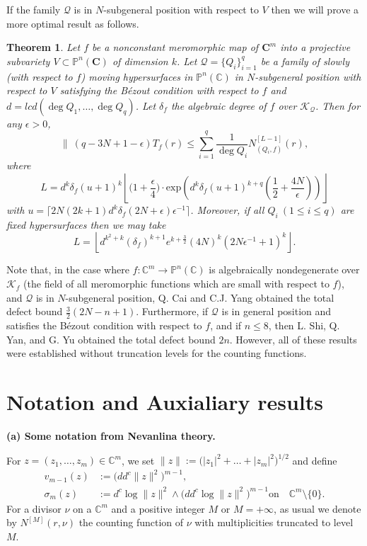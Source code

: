 \documentclass[12pt,leqno]{amsart}
\newtheorem{theorem}[equation]{Theorem}
\newcommand{\C}{{\mathbb{C}}}
\renewcommand{\P}{{\mathbb{P}}}
\numberwithin{equation}{section}
\begin{document}
If the family $\mathcal Q$ is in $N$-subgeneral position with respect to $V$ then we will prove a more optimal result as follows.
\begin{theorem}\label{1.2}
Let $f$ be a nonconstant meromorphic map of $\mathbf{C}^m$ into a projective subvariety $V\subset\P^n(\mathbf{C})$ of dimension $k$. Let $\mathcal Q=\{Q_i\}_{i=1}^q$ be a family of slowly (with respect to $f$) moving hypersurfaces in $\P^n(\C)$ in $N$-subgeneral position with respect to $V$ satisfying the B\'{e}zout condition with respect to $f$ and $d=lcd(\deg Q_1,\ldots,\deg Q_q)$. Let $\delta_f$ the algebraic degree of $f$ over $\mathcal K_{\mathcal Q}$. Then for any $\epsilon >0$, 
$$  \|\ (q-3N+1-\epsilon)T_f(r)\le \sum_{i=1}^{q}\dfrac{1}{\deg Q_i}N^{[L-1]}_{(Q_i,f)}(r),$$
where $$L=d^k\delta_f(u+1)^k\left\lfloor\biggl(1+\frac{\epsilon}{4}\biggl)\cdot\mathrm{exp}\left(d^k\delta_f(u+1)^{k+q}\left(\frac{1}{2}+\frac{4N}{\epsilon}\right)\right)\right\rfloor$$
with $u=\lceil 2N(2k+1)d^k\delta_f(2N+\epsilon)\epsilon^{-1}\rceil$. Moreover, if all $Q_i\ (1\le i\le q)$ are fixed hypersurfaces then we may take 
$$L=\left\lfloor d^{k^2+k}(\delta_f)^{k+1}e^{k+\frac{3}{2}}(4N)^k(2N\epsilon^{-1}+1)^k\right\rfloor.$$
\end{theorem} 
Note that, in the case where $f:\C^m\rightarrow\P^n(\C)$ is algebraically nondegenerate over $\mathcal K_f$ (the field of all meromorphic functions which are small with respect to $f$), and $\mathcal Q$ is in $N$-subgeneral position, Q. Cai and C.J. Yang \cite{CY} obtained the total defect bound $\frac{3}{2}(2N-n+1).$ Furthermore, if $\mathcal Q$ is in general position and satisfies the B\'ezout condition with respect to $f$, and if $n\le 8$, then L. Shi, Q. Yan, and G. Yu \cite{SYY} obtained the total defect bound $2n.$ However, all of these results were established without truncation levels for the counting functions.

\section{Notation and Auxialiary results}

\noindent
\textbf{(a) Some notation from Nevanlina theory.}

For $z = (z_1,\dots,z_m) \in \mathbb C^m$, we set $ \|z\|:= \big(|z_1|^2 + \dots + |z_m|^2\big)^{1/2}$ and define
\begin{align*}
v_{m-1}(z) &:= \big(dd^c \|z\|^2\big)^{m-1},\\
\sigma_m(z)&:= d^c\log\|z\|^2 \land \big(dd^c\log\|z\|^2\big)^{m-1} \text{on} \quad \mathbb C^m \setminus \{0\}.
\end{align*}
 For a divisor $\nu$ on  a $\mathbb C^m$ and a positive integer $M$ or $M= +\infty$, as usual we denote by $N^{[M]}(r,\nu)$ the counting function of $\nu$ with multiplicities truncated to level $M$.
\end{document}
